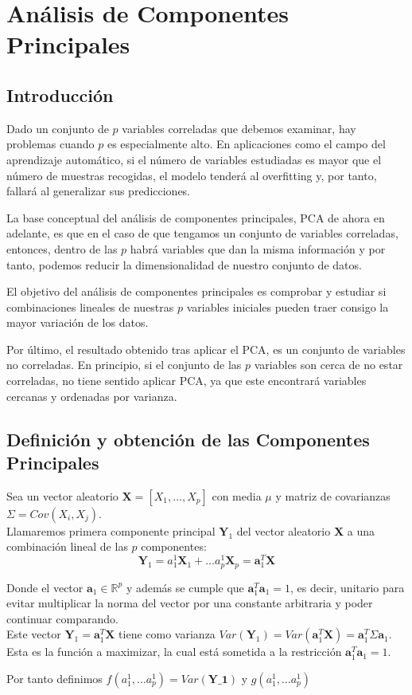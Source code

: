 \chapter{Análisis de Componentes Principales}
\section{Introducción}

\noindent Dado un conjunto de $p$ variables correladas que debemos examinar, hay problemas cuando $p$ es especialmente alto. En aplicaciones como el campo del aprendizaje automático, si el número de variables estudiadas es mayor que el número de muestras recogidas, el modelo tenderá al overfitting y, por tanto, fallará al generalizar sus predicciones.

\noindent La base conceptual del análisis de componentes principales, PCA de ahora en adelante, es que en el caso de que tengamos un conjunto de variables correladas, entonces, dentro de las $p$ habrá variables que dan la misma información y por tanto, podemos reducir la dimensionalidad de nuestro conjunto de datos. 

\noindent El objetivo del análisis de componentes principales es comprobar y estudiar si combinaciones lineales de nuestras $p$ variables iniciales pueden traer consigo la mayor variación de los datos. 

\noindent Por último, el resultado obtenido tras aplicar el PCA, es un conjunto de variables no correladas. En principio, si el conjunto de las $p$ variables son cerca de no estar correladas, no tiene sentido aplicar PCA, ya que este encontrará variables cercanas y ordenadas por varianza. 

\newpage

\section{Definición y obtención de las Componentes Principales}

\noindent Sea un vector aleatorio $\textbf{X}=[X_1,\ldots,X_p]$ con media $\mu$ y matriz de covarianzas $\Sigma= Cov(X_i,X_j)$.\\[0.5 ex]

\noindent Llamaremos primera componente principal $\textbf{Y}_1$ del vector aleatorio \textbf{X} a una combinación lineal de las $p$ componentes:
$$\textbf{Y}_1=a_1^1 \textbf{X}_1 + \ldots a_p^1\textbf{X}_p=\textbf{a}_1^T\textbf{X}$$

\noindent Donde el vector $\textbf{a}_1\in \mathbb{R}^p$ y además se cumple que $\textbf{a}_1^T \textbf{a}_1=1$, es decir, unitario para evitar multiplicar la norma del vector por una constante arbitraria y poder continuar comparando.\\[2ex]
\noindent Este vector $\textbf{Y}_1=\textbf{a}_1^T \textbf{X}$ tiene como varianza $Var(\textbf{Y}_1)= Var (\textbf{a}_1^T \textbf{X})=\textbf{a}_1^T \Sigma \textbf{a}_1$. Esta es la función a maximizar, la cual está sometida a la restricción $\textbf{a}_1^T\textbf{a}_1=1$. 

Por tanto definimos $f(a_1^1,\ldots a_p^1)=Var(\textbf{Y_1})$ y $g(a_1^1,\ldots a_p^1)$